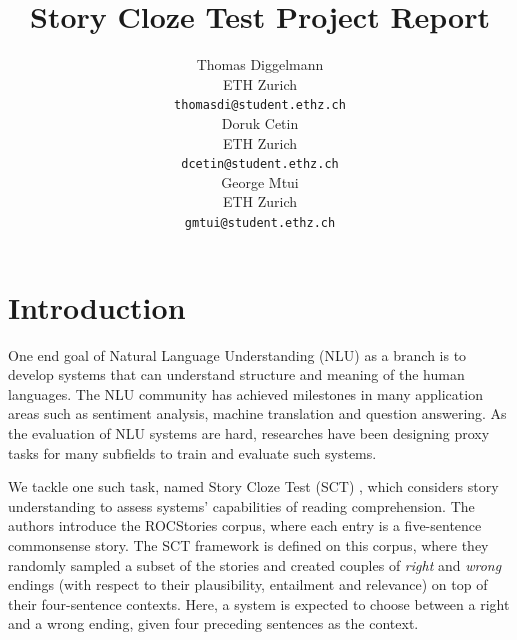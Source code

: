 \documentclass{article}
\title{Story Cloze Test Project Report}
\author{
  Thomas Diggelmann\\
  ETH Zurich\\
  \texttt{thomasdi@student.ethz.ch}\\
  \And
  Doruk Cetin\\
  ETH Zurich\\
  \texttt{dcetin@student.ethz.ch}\\
  \And
  George Mtui\\
  ETH Zurich\\
  \texttt{gmtui@student.ethz.ch}\\
}
\begin{document}

\maketitle


\section{Introduction}
One end goal of Natural Language Understanding (NLU) as a branch is to develop systems that can understand structure and meaning of the human languages. The NLU community has achieved milestones in many application areas such as sentiment analysis, machine translation and question answering. As the evaluation of NLU systems are hard, researches have been designing proxy tasks for many subfields to train and evaluate such systems.

\par We tackle one such task, named Story Cloze Test (SCT) \citep{mostafazadeh2016corpus}, which considers story understanding to assess systems' capabilities of reading comprehension. The authors introduce the ROCStories corpus, where each entry is a five-sentence commonsense story. The SCT framework is defined on this corpus, where they randomly sampled a subset of the stories and created couples of \textit{right} and \textit{wrong} endings (with respect to their plausibility, entailment and relevance) on top of their four-sentence contexts. Here, a system is expected to choose between a right and a wrong ending, given four preceding sentences as the context.
\end{document}
